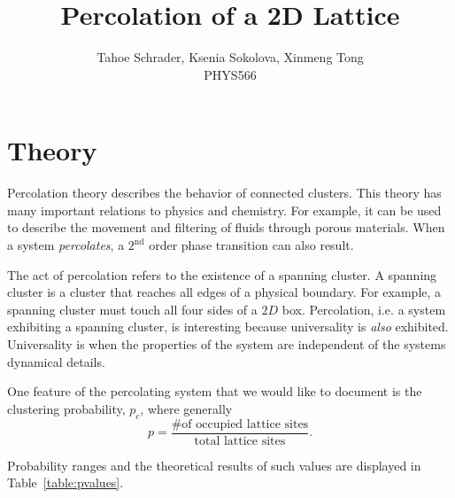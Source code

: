 \documentclass[12pt]{article}
\title{Percolation of a 2D Lattice}
\author{Tahoe Schrader, Ksenia Sokolova, Xinmeng Tong \\PHYS566}
\date{}
\begin{document}
\maketitle



\section{Theory}
\label{sec:theory}
Percolation theory describes the behavior of connected clusters. This theory has many important relations to physics and chemistry. For example, it can be used to describe the movement and filtering of fluids through porous materials. When a system \emph{percolates}, a $2^\text{nd}$ order phase transition can also result.

The act of percolation refers to the existence of a spanning cluster. A spanning cluster is a cluster that reaches all edges of a physical boundary. For example, a spanning cluster must touch all four sides of a $2D$ box. Percolation, i.e. a system exhibiting a spanning cluster, is interesting because universality is \emph{also} exhibited. Universality is when the properties of the system are independent of the systems dynamical details.

One feature of the percolating system that we would like to document is the clustering probability, $p_c$, where generally
\begin{equation}
  \label{eq:probability}
  p = \frac{\text{\# of occupied lattice sites}}{\text{total lattice sites}}.
\end{equation}

Probability ranges and the theoretical results of such values are displayed in Table~\ref{table:pvalues}.
\begin{table}[!htb]
\end{table}
\end{document}

